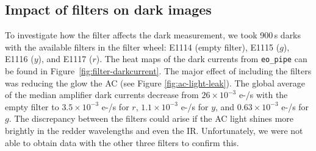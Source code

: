 \subsection{Impact of filters on dark images}\label{filter-condition-impact-on-darks}

To investigate how the filter affects the dark measurement, we took 900\,s darks with the available filters in the filter wheel: E1114 (empty filter), E1115 ($g$), E1116 ($y$), and E1117 ($r$). The heat maps of the dark currents from {\tt eo\_pipe} can be found in Figure~\ref{fig:filter-darkcurrent}. The major effect of including the filters was reducing the glow the AC (see Figure \ref{fig:ac-light-leak}). The global average of the median amplifier dark currents decrease from $26 \times 10^{-3}$ e-/s with the empty filter to $3.5 \times 10^{-3}$ e-/s for $r$, $1.1 \times 10^{-3}$ e-/s for $y$, and $0.63 \times 10^{-3}$ e-/s for $g$. The discrepancy between the filters could arise if the AC light shines more brightly in the redder wavelengths and even the IR. Unfortunately, we were not able to obtain data with the other three filters to confirm this.

